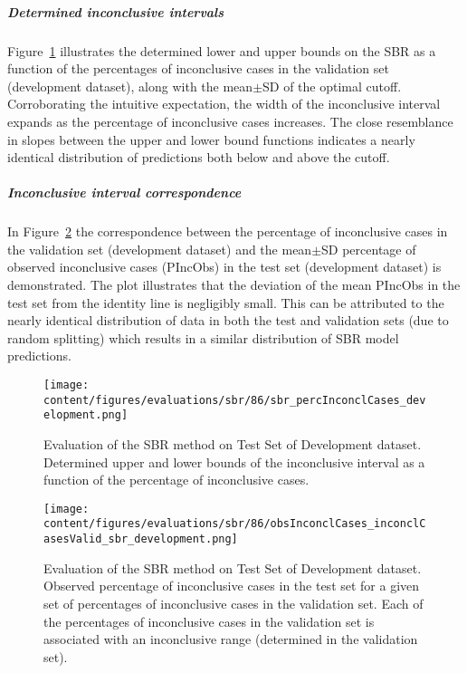 \subparagraph{Determined inconclusive intervals}

Figure~\ref{fig:sbr_percInconclCases_development} illustrates the determined lower and upper bounds on the SBR 
as a function of the percentages of inconclusive cases in the validation set (development dataset), 
along with the mean$\pm$SD of the optimal cutoff.
Corroborating the intuitive expectation, the width of the inconclusive interval expands 
as the percentage of inconclusive cases increases.
The close resemblance in slopes between the upper and lower bound functions 
indicates a nearly identical distribution of predictions both below and above the cutoff.

\subparagraph{Inconclusive interval correspondence}

In Figure~\ref{fig:obsInconclCases_inconclCasesValid_sbr_development} the correspondence between 
the percentage of inconclusive cases in the validation set (development dataset) and 
the mean$\pm$SD percentage of observed inconclusive cases (PIncObs) in the test set (development dataset) is demonstrated.
The plot illustrates that the deviation of the mean PIncObs in the test set from the 
identity line is negligibly small.
This can be attributed to the nearly identical distribution of data in both the test and validation sets 
(due to random splitting) which results in a similar distribution of SBR model predictions.


\begin{figure}[ht]
    \centering
    \texttt{[image: content/figures/evaluations/sbr/86/sbr\_percInconclCases\_development.png]}
    \caption{Evaluation of the SBR method on Test Set of Development dataset. 
    Determined upper and lower bounds of the inconclusive interval as a function of the percentage of inconclusive cases.} 
    \label{fig:sbr_percInconclCases_development}
\end{figure}


\begin{figure}[ht]
    \centering
    \texttt{[image: content/figures/evaluations/sbr/86/obsInconclCases\_inconclCasesValid\_sbr\_development.png]}
    \caption{Evaluation of the SBR method on Test Set of Development dataset.
    Observed percentage of inconclusive cases in the test set 
    for a given set of percentages of inconclusive cases in the validation set.
    Each of the percentages of inconclusive cases in the validation set is associated 
    with an inconclusive range (determined in the validation set).} 
    \label{fig:obsInconclCases_inconclCasesValid_sbr_development}
\end{figure} 

